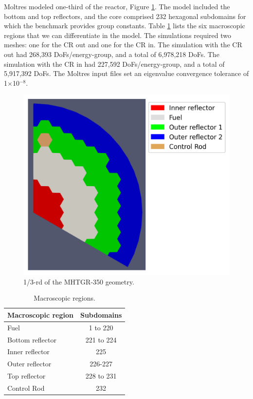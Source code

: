 Moltres modeled one-third of the reactor, Figure \ref{fig:bench-mesh}.
The model included the bottom and top reflectors, and the core comprised 232 hexagonal subdomains for which the benchmark provides group constants.
Table \ref{tab:mac-region} lists the six macroscopic regions that we can differentiate in the model.
The simulations required two meshes: one for the CR out and one for the CR in.
The simulation with the CR out had 268,393 \glspl{DoF}/energy-group, and a total of 6,978,218 DoFs.
The simulation with the CR in had 227,592 \glspl{DoF}/energy-group, and a total of 5,917,392 DoFs.
The Moltres input files set an eigenvalue convergence tolerance of 1$\times$10$^{-8}$.

\begin{figure}[htbp!]
	\centering
	\includegraphics[width=0.55\linewidth]{figures-neutronics/oecd-fullcore-legend}
	\hfill
	\caption{1/3-rd of the MHTGR-350 geometry.}
	\label{fig:bench-mesh}
\end{figure}

\begin{table}[htbp!]
  \centering
  \caption{Macroscopic regions.}
  \label{tab:mac-region}
  \begin{tabular}{@{}l c}
  \toprule
  Macroscopic region    & Subdomains     \\
  \midrule
  Fuel              & 1 to 220      \\
  Bottom reflector  & 221 to 224    \\
  Inner reflector   & 225           \\
  Outer reflector   & 226-227       \\
  Top reflector     & 228 to 231    \\
  Control Rod       & 232           \\
  \bottomrule
  \end{tabular}
\end{table}

